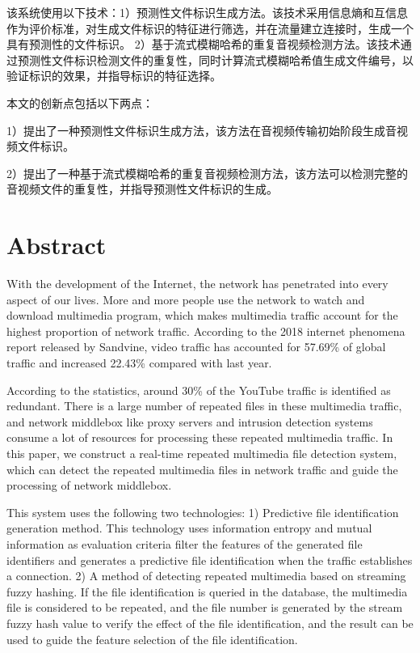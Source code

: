 该系统使用以下技术：1）预测性文件标识生成方法。该技术采用信息熵和互信息作为评价标准，对生成文件标识的特征进行筛选，并在流量建立连接时，生成一个具有预测性的文件标识。 2）基于流式模糊哈希的重复音视频检测方法。该技术通过预测性文件标识检测文件的重复性，同时计算流式模糊哈希值生成文件编号，以验证标识的效果，并指导标识的特征选择。

本文的创新点包括以下两点：

1）提出了一种预测性文件标识生成方法，该方法在音视频传输初始阶段生成音视频文件标识。

2）提出了一种基于流式模糊哈希的重复音视频检测方法，该方法可以检测完整的音视频文件的重复性，并指导预测性文件标识的生成。

\chapter*{Abstract}%

With the development of the Internet, the network has penetrated into every aspect of our lives. More and more people use the network to watch and download multimedia program, which makes multimedia traffic account for the highest proportion of network traffic. According to the 2018 internet phenomena report released by Sandvine, video traffic has accounted for 57.69\% of global traffic and increased 22.43\% compared with last year.

According to the statistics, around 30\% of the YouTube traffic is identified as redundant. There is a large number of repeated files in these multimedia traffic, and network middlebox like proxy servers and intrusion detection systems consume a lot of resources for processing these repeated multimedia traffic. In this paper, we construct a real-time repeated multimedia file detection system, which can detect the repeated multimedia files in network traffic and guide the processing of network middlebox.

This system uses the following two technologies: 1) Predictive file identification generation method. This technology uses information entropy and mutual information as evaluation criteria filter the features of the generated file identifiers and generates a predictive file identification when the traffic establishes a connection. 2) A method of detecting repeated multimedia based on streaming fuzzy hashing. If the file identification is queried in the database, the multimedia file is considered to be repeated, and the file number is generated by the stream fuzzy hash value to verify the effect of the file identification, and the result can be used to guide the feature selection of the file identification. 

